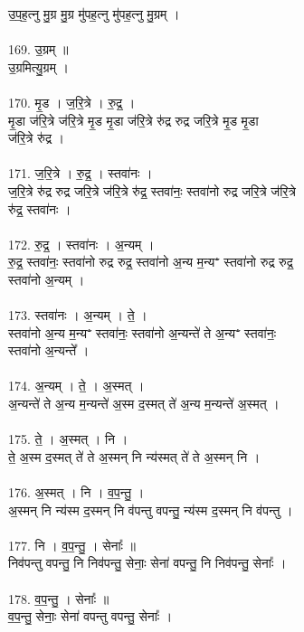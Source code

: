 उ॒प॒ह॒त्नु मु॒ग्र मु॒ग्र मु॑पह॒त्नु मु॑पह॒त्नु मु॒ग्रम् ।\\
\\
169. उ॒ग्रम् ॥\\
उ॒ग्रमित्यु॒ग्रम् ।\\
\\
170. मृ॒ड । ज॒रि॒त्रे । रु॒द्र॒ ।\\
मृ॒डा ज॑रि॒त्रे ज॑रि॒त्रे मृ॒ड मृ॒डा ज॑रि॒त्रे रु॑द्र रुद्र जरि॒त्रे मृ॒ड मृ॒डा\\
ज॑रि॒त्रे रु॑द्र ।\\
\\
171. ज॒रि॒त्रे । रु॒द्र॒ । स्तवा॑नः ।\\
ज॒रि॒त्रे रु॑द्र रुद्र जरि॒त्रे ज॑रि॒त्रे रु॑द्र॒ स्तवा॑नः॒ स्तवा॑नो रुद्र जरि॒त्रे ज॑रि॒त्रे\\
रु॑द्र॒ स्तवा॑नः ।\\
\\
172. रु॒द्र॒ । स्तवा॑नः । अ॒न्यम् ।\\
रु॒द्र॒ स्तवा॑नः॒ स्तवा॑नो रुद्र रुद्र॒ स्तवा॑नो अ॒न्य म॒न्यꣲ स्तवा॑नो रुद्र रुद्र॒\\
स्तवा॑नो अ॒न्यम् ।\\
\\
173. स्तवा॑नः । अ॒न्यम् । ते॒ ।\\
स्तवा॑नो अ॒न्य म॒न्यꣲ स्तवा॑नः॒ स्तवा॑नो अ॒न्यन्ते॑ ते अ॒न्यꣲ स्तवा॑नः॒\\
स्तवा॑नो अ॒न्यन्ते᳚ ।\\
\\
174. अ॒न्यम् । ते॒ । अ॒स्मत् ।\\
अ॒न्यन्ते॑ ते अ॒न्य म॒न्यन्ते॑ अ॒स्म द॒स्मत् ते॑ अ॒न्य म॒न्यन्ते॑ अ॒स्मत् ।\\
\\
175. ते॒ । अ॒स्मत् । नि ।\\
ते॒ अ॒स्म द॒स्मत् ते॑ ते अ॒स्मन् नि न्य॑स्मत् ते॑ ते अ॒स्मन् नि ।\\
\\
176. अ॒स्मत् । नि । व॒प॒न्तु॒ ।\\
अ॒स्मन् नि न्य॑स्म द॒स्मन् नि व॑पन्तु वपन्तु॒ न्य॑स्म द॒स्मन् नि व॑पन्तु ।\\
\\
177. नि । व॒प॒न्तु॒ । सेनाः᳚ ॥\\
निव॑पन्तु वपन्तु॒ नि निव॑पन्तु॒ सेनाः॒ सेना॑ वपन्तु॒ नि निव॑पन्तु॒ सेनाः᳚ ।\\
\\
178. व॒प॒न्तु॒ । सेनाः᳚ ॥\\
व॒प॒न्तु॒ सेनाः॒ सेना॑ वपन्तु वपन्तु॒ सेनाः᳚ ।\\
